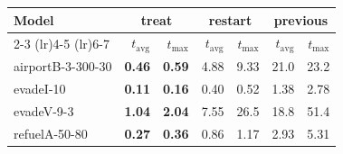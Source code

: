 \begin{tabular}{lrrrrrr}
\toprule
\multirow{2}{*}{Model} & \multicolumn{2}{c}{treat} & \multicolumn{2}{c}{restart} & \multicolumn{2}{c}{previous} \\
    \cmidrule(lr){2-3} \cmidrule(lr){4-5} \cmidrule(lr){6-7}
 & $t_\text{avg}$ & $t_\text{max}$ & $t_\text{avg}$ & $t_\text{max}$ & $t_\text{avg}$ & $t_\text{max}$ \\
\midrule
airportB-3-300-30 & \textbf{0.46} & \textbf{0.59} & 4.88 & 9.33 & 21.0 & 23.2 \\
evadeI-10 & \textbf{0.11} & \textbf{0.16} & 0.40 & 0.52 & 1.38 & 2.78 \\
evadeV-9-3 & \textbf{1.04} & \textbf{2.04} & 7.55 & 26.5 & 18.8 & 51.4 \\
refuelA-50-80 & \textbf{0.27} & \textbf{0.36} & 0.86 & 1.17 & 2.93 & 5.31 \\
\bottomrule
\end{tabular}
